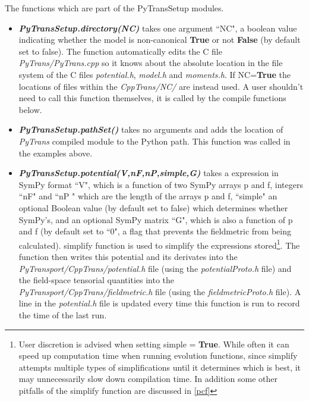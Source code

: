 \documentclass[10pt,
amsmath,amssymb,
aps,prd,nofootinbib,eqsecnum,a4paper]{revtex4}
\newcommand{\CC}{C\nolinebreak\hspace{-.05em}\raisebox{.4ex}{\tiny\bf +}\nolinebreak\hspace{-.10em}\raisebox{.4ex}{\tiny\bf +}}
\def\CC{{C\nolinebreak[4]\hspace{-.05em}\raisebox{.4ex}{\tiny\bf ++}}}
\def\S{ }
\begin{document}
The functions which are part of the { PyTransSetup} modules.

\begin{itemize}
\item    {\it \bf PyTransSetup.directory(NC)} takes one argument ``NC", a boolean value indicating whether the model is non-canonical {\color{blue}\bf{True}} or not {\color{blue}\bf{False}} (by default set to false).
The function automatically edits the \CC \S file {\it PyTrans/PyTrans.cpp} so it knows about the absolute location in the file system of the \CC \S files  {\it potential.h}, {\it model.h} and {\it moments.h}. If NC={\color{blue}\bf{True}} the locations of files within the {\it CppTrans/NC/} are instead used. A user shouldn't need to call this function themselves, it is called by the compile functions below.

\item    {\it \bf PyTransSetup.pathSet()} takes no arguments and adds the location of {\it PyTrans} compiled module to the Python path. This function was called in the examples above.


\item    {\it \bf PyTransSetup.potential(V,nF,nP,simple,G)} takes a expression in SymPy format ``V", which is a function of two SymPy arrays p and f, integers ``nF" and ``nP " which are the length of the arrays p and f, ``simple" an optional Boolean value (by default set to false) which determines whether SymPy's, and an optional SymPy matrix ``G", which is also a function of p and f (by default set to ``$0$", a flag that prevents the fieldmetric from being calculated).
simplify function is used to simplify the expressions stored\footnote{User discretion is advised when setting simple = {\color{blue}\bf{True}}. While often it can speed up computation time when running evolution functions, since simplify attempts multiple types of simplifications until it determines which is best, it may unnecessarily slow down compilation time. In addition some other pitfalls of the simplify function are discussed in \ref{pcf}}. The function then writes this potential and its derivates into the {\it PyTransport/CppTrans/potential.h} file (using the {\it potentialProto.h} file) and the field-space tensorial quantities into the {\it PyTransport/CppTrans/fieldmetric.h} file (using the {\it fieldmetricProto.h} file). A line in the {\it potential.h} file is updated every time this function is run to record the 
time of the last run.


\end{itemize}
\end{document}
